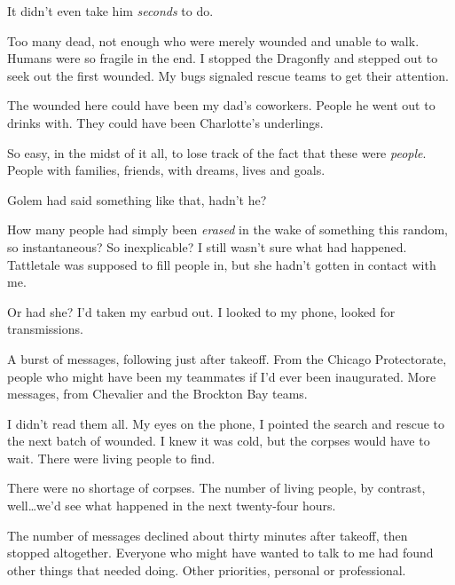 It didn't even take him \emph{seconds} to do.



Too many dead, not enough who were merely wounded and unable to walk.  Humans were so fragile in the end.  I stopped the Dragonfly and stepped out to seek out the first wounded.  My bugs signaled rescue teams to get their attention.



The wounded here could have been my dad's coworkers.  People he went out to drinks with.  They could have been Charlotte's underlings.



So easy, in the midst of it all, to lose track of the fact that these were \emph{people}.  People with families, friends, with dreams, lives and goals.



Golem had said something like that, hadn't he?



How many people had simply been \emph{erased} in the wake of something this random, so instantaneous?  So inexplicable?  I still wasn't sure what had happened.  Tattletale was supposed to fill people in, but she hadn't gotten in contact with me.



Or had she?  I'd taken my earbud out.  I looked to my phone, looked for transmissions.



A burst of messages, following just after takeoff.  From the Chicago Protectorate, people who might have been my teammates if I'd ever been inaugurated.  More messages, from Chevalier and the Brockton Bay teams.



I didn't read them all.  My eyes on the phone, I pointed the search and rescue to the next batch of wounded.  I knew it was cold, but the corpses would have to wait.  There were living people to find.



There were no shortage of corpses.  The number of living people, by contrast, well\ldots we'd see what happened in the next twenty-four hours.



The number of messages declined about thirty minutes after takeoff, then stopped altogether.  Everyone who might have wanted to talk to me had found other things that needed doing.  Other priorities, personal or professional.



